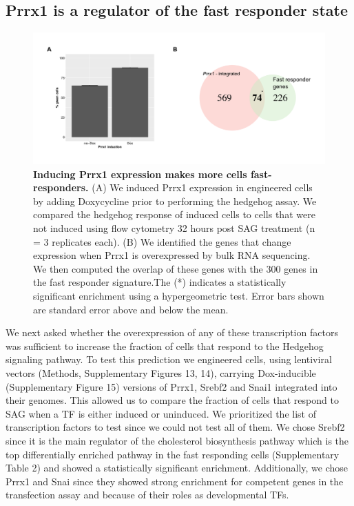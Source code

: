 \subsection{Prrx1 is a regulator of the fast responder state}
\begin{figure}[t!]  
    \centering
    \includegraphics[width=\linewidth]{figures/hedgehog/hh_figure3.pdf}
    \caption[Inducing Prrx1 expression makes more cells fast-responders.]{%
        \textbf{Inducing Prrx1 expression makes more cells fast-responders.} (A) We induced Prrx1 expression in engineered cells by adding Doxycycline prior to performing the hedgehog assay. We compared the hedgehog response of induced cells to cells that were not induced using flow cytometry 32 hours post SAG treatment (n = 3 replicates each). (B) We identified the genes that change expression when Prrx1 is overexpressed by bulk RNA sequencing. We then computed the overlap of these genes with the 300 genes in the fast responder signature.The (*) indicates a statistically significant enrichment using a hypergeometric test. Error bars shown are standard error above and below the mean.
    }
    \label{fig:hh_figure3}
\end{figure}
We next asked whether the overexpression of any of these transcription factors was sufficient to increase the fraction of cells that respond to the Hedgehog signaling pathway. To test this prediction we engineered cells, using lentiviral vectors (Methods, Supplementary Figures 13, 14), carrying Dox-inducible (Supplementary Figure 15) versions of Prrx1, Srebf2 and Snai1 integrated into their genomes. This allowed us to compare the fraction of cells that respond to SAG when a TF is either induced or uninduced. We prioritized the list of transcription factors to test since we could not test all of them. We chose Srebf2 since it is the main regulator of the cholesterol biosynthesis pathway which is the top differentially enriched pathway in the fast responding cells (Supplementary Table 2) and showed a statistically significant enrichment. Additionally, we chose Prrx1 and Snai since they showed strong enrichment for competent genes in the transfection assay and because of their roles as developmental TFs.

